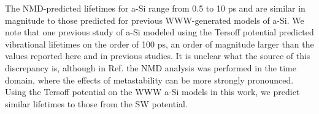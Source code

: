 \documentclass[aps,prb,onecolumn,preprint,superscriptaddress,footinbib,amsmath,amssymb,floatfix]{revtex4}
\begin{document}
The NMD-predicted lifetimes for a-Si range from 0.5 to 10 ps 
and are similar in magnitude to 
those predicted for previous WWW-generated models of a-Si.
\cite{fabian_anharmonic_1996,bickham_calculation_1998,
bickham_numerical_1999,fabian_numerical_2003}  
We note that one previous study of a-Si modeled using the 
Tersoff potential predicted vibrational lifetimes on 
the order of 100 ps,\cite{he_heat_2011} an order of magnitude larger 
than the values reported here and in previous studies.
\cite{fabian_anharmonic_1996,bickham_calculation_1998,
bickham_numerical_1999,fabian_numerical_2003} 
It is unclear what the source of this 
discrepancy is, although in Ref.  
the NMD analysis was performed in the time domain, where the effects of 
metastability can be more strongly pronounced. Using the Tersoff 
potential on the WWW a-Si models in this work, we predict similar 
lifetimes to those from the SW potential. 
\end{document}
